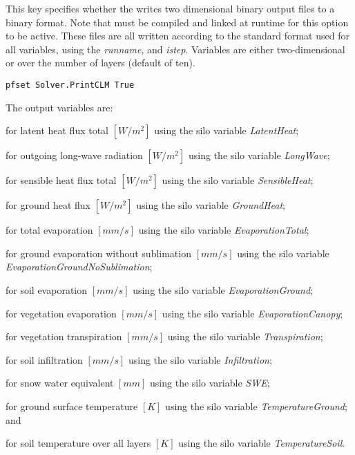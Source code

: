 {This key specifies whether the  writes two dimensional binary output files to a  binary format. Note that  must be compiled and linked at runtime for this option to be active. These files are all written according to the standard format used for all \parflow{} variables, using the {\em runname}, and {\em istep}.  Variables are either two-dimensional or over the number of  layers (default of ten).
}
\begin{display}\begin{verbatim}
pfset Solver.PrintCLM True
\end{verbatim}\end{display}
The output variables are:
\begin{description}
\item {} for latent heat flux total $[W/m^2]$ using the silo variable {\em LatentHeat};
\item {} for outgoing long-wave radiation $[W/m^2]$ using the silo variable {\em LongWave};
\item {} for sensible heat flux total $[W/m^2]$ using the silo variable {\em SensibleHeat};
\item {} for ground heat flux $[W/m^2]$ using the silo variable {\em GroundHeat};
\item {} for total evaporation $[mm/s]$ using the silo variable {\em EvaporationTotal};
\item {} for ground evaporation without sublimation $[mm/s]$ using the silo variable {\em EvaporationGroundNoSublimation};
\item {} for soil evaporation $[mm/s]$ using the silo variable {\em EvaporationGround};
\item {} for vegetation evaporation $[mm/s]$ using the silo variable {\em EvaporationCanopy};
\item {} for vegetation transpiration $[mm/s]$ using the silo variable {\em Transpiration};
\item {} for soil infiltration $[mm/s]$ using the silo variable {\em Infiltration};
\item {} for snow water equivalent $[mm]$ using the silo variable {\em SWE};
\item {} for ground surface temperature $[K]$ using the silo variable {\em TemperatureGround}; and
\item {} for soil temperature over all layers $[K]$ using the silo variable {\em TemperatureSoil}.
\end{description}

